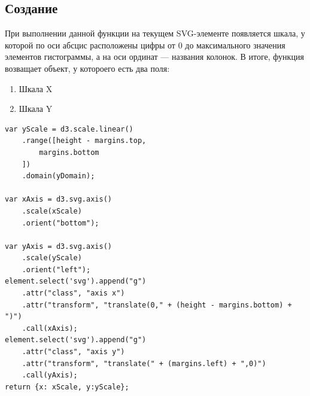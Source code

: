\documentclass[a4paper,14pt]{extreport}
\begin{document}
\subsection{Создание}
\hspace{4ex}При выполнении данной функции на текущем SVG-элементе появляется шкала, у которой по оси абсцис расположены цифры от 0 до максимального значения элементов гистограммы, а на оси ординат --- названия колонок.
\hspace{4ex}В итоге, функция возващает объект, у котороего есть два поля:
\begin{enumerate}
	\item Шкала X
	\item Шкала Y
\end{enumerate}
\begin{verbatim}
var yScale = d3.scale.linear()
    .range([height - margins.top,
        margins.bottom
    ])
    .domain(yDomain);

var xAxis = d3.svg.axis()
    .scale(xScale)
    .orient("bottom");

var yAxis = d3.svg.axis()
    .scale(yScale)
    .orient("left");
element.select('svg').append("g")
    .attr("class", "axis x")
    .attr("transform", "translate(0," + (height - margins.bottom) + ")")
    .call(xAxis);
element.select('svg').append("g")
    .attr("class", "axis y")
    .attr("transform", "translate(" + (margins.left) + ",0)")
    .call(yAxis);
return {x: xScale, y:yScale};
\end{verbatim}
\end{document}
